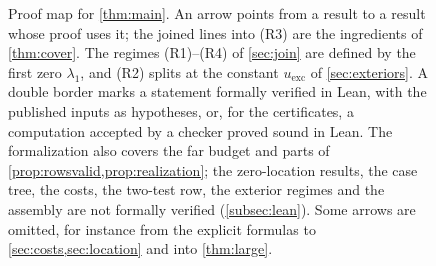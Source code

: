 \begin{figure}[tbp]
\caption{Proof map for \cref{thm:main}. An arrow points from a result to a result whose
proof uses it; the joined lines into (R3) are the ingredients of \cref{thm:cover}. The
regimes (R1)--(R4) of \cref{sec:join} are defined by the first zero $\lambda_1$, and (R2)
splits at the constant $u_{\mathrm{exc}}$ of \cref{sec:exteriors}. A double border marks a
statement formally verified in Lean, with the published inputs as hypotheses, or, for the
certificates, a computation accepted by a checker proved sound in Lean. The formalization
also covers the far budget and parts of \cref{prop:rowsvalid,prop:realization}; the
zero-location results, the case tree, the costs, the two-test row, the exterior regimes and
the assembly are not formally verified (\cref{subsec:lean}). Some arrows are omitted, for
instance from the explicit formulas to \cref{sec:costs,sec:location} and into
\cref{thm:large}.}
\label{fig:proofmap}
\end{figure}

